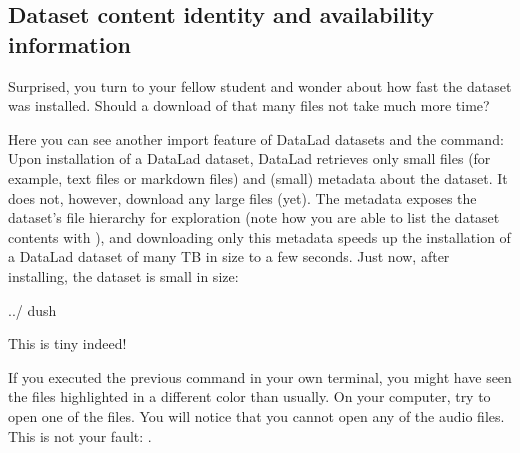\subsection{Dataset content identity and availability information}
\label{\detokenize{basics/101-105-install:dataset-content-identity-and-availability-information}}
\sphinxAtStartPar
Surprised, you turn to your fellow student and wonder about
how fast the dataset was installed. Should
a download of that many  files not take much more time?

\sphinxAtStartPar
Here you can see another import feature of DataLad datasets
and the  command:
Upon installation of a DataLad dataset, DataLad retrieves only small files
(for example, text files or markdown files) and (small) metadata
about the dataset. It does not, however, download any large files
(yet). The metadata exposes the dataset’s file hierarchy
for exploration (note how you are able to list the dataset contents with ),
and downloading only this metadata speeds up the installation of a DataLad dataset
of many TB in size to a few seconds. Just now, after installing, the dataset is
small in size:

\ignorespaces 
\def\sphinxLiteralBlockLabel{\label{\detokenize{basics/101-105-install:index-4}}}
\begin{sphinxVerbatim}[commandchars=\\\{\}]
../
du\PYGZhy{}sh
\end{sphinxVerbatim}

\sphinxAtStartPar
This is tiny indeed!

\sphinxAtStartPar
If you executed the previous  command in your own terminal, you might have seen
the  files highlighted in a different color than usually.
On your computer, try to open one of the  files.
You will notice that you cannot open any of the audio files.
This is not your fault: .

